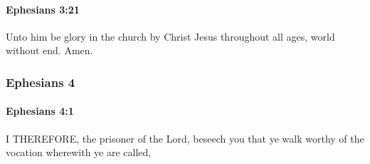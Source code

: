 		\paragraph{Ephesians 3:21} %
			\label{EPHESIANS-3-21}

			Unto him be glory in the church by Christ Jesus throughout all ages, world without end.  Amen.

			\begin{framed}
			\scriptsize
				\begin{compactdesc}
					\item[SBLG] 
				\end{compactdesc}
			\end{framed}

	\subsubsection{Ephesians 4} %
		\label{EPHESIANS-4}
		
		\paragraph{Ephesians 4:1} %
			\label{EPHESIANS-4-1}

			I THEREFORE, the prisoner of the Lord, beseech you that ye walk worthy of the vocation wherewith ye are called,

